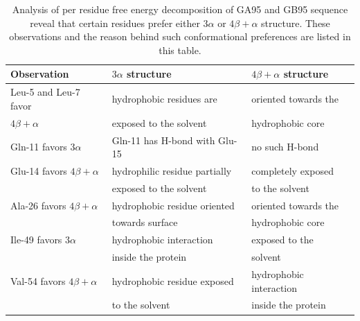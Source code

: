\documentclass[12pt]{article}
\begin{document}
\begin{table}
\begin{center}
\caption{Analysis of per residue free energy decomposition of GA95 and GB95 sequence reveal that certain residues prefer
either $3 \alpha$  or $4 \beta + \alpha$ structure. These observations and the reason behind such conformational preferences are listed in this
table.}
\label{table:orban_perresidue}
\begin{tabular}{| l | l | l |}
\hline
    Observation                                & $3 \alpha$ structure           &    $4 \beta + \alpha$ structure                       \\ \hline
    Leu-5 and Leu-7 favor                      & hydrophobic residues are       & oriented towards the                                  \\ 
    $4 \beta + \alpha$                         & exposed to the solvent         & hydrophobic core                                      \\ \hline
    Gln-11 favors $3 \alpha$                   & Gln-11 has H-bond with Glu-15  & no such H-bond                                        \\ \hline
    Glu-14 favors $4 \beta + \alpha$           & hydrophilic residue partially  & completely exposed                                    \\       
                                               & exposed to the solvent         & to the solvent                                        \\ \hline        
    Ala-26 favors  $4 \beta + \alpha$          & hydrophobic residue oriented   & oriented towards the                                   \\ 
                                               & towards surface                & hydrophobic core                                       \\ \hline
    Ile-49 favors $3 \alpha$                   & hydrophobic interaction        & exposed to the                                          \\
                                               & inside the protein             & solvent                                                \\ \hline 
    Val-54 favors $4 \beta + \alpha$           & hydrophobic residue exposed    & hydrophobic interaction                                \\
                                               & to the solvent                 & inside the protein                                      \\ \hline

\end{tabular}
\end{center}
\end{table}
\end{document}
